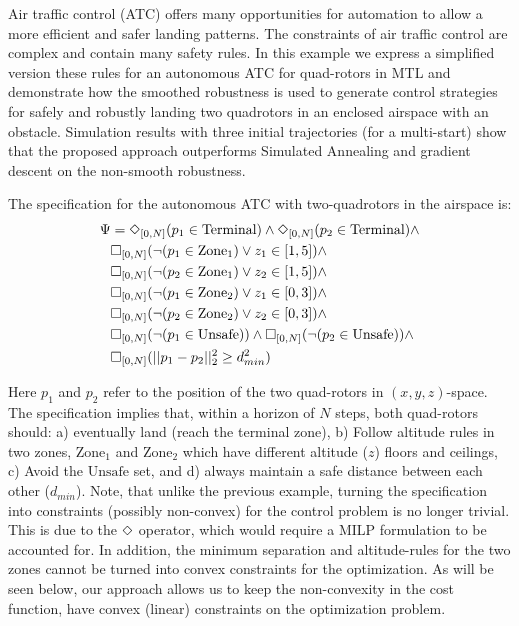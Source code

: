 
Air traffic control (ATC) offers many opportunities for automation to allow a more efficient and safer landing patterns. The constraints of air traffic control are complex and contain many safety rules. In this example we express a simplified version these rules for an autonomous ATC for quad-rotors in MTL and demonstrate how the smoothed robustness is used to generate control strategies for safely and robustly landing two quadrotors in an enclosed airspace with an obstacle. Simulation results with three initial trajectories (for a multi-start) show that the proposed approach outperforms Simulated Annealing and gradient descent on the non-smooth robustness.

The specification for the autonomous ATC with two-quadrotors in the airspace is:
{\small
\begin{subequations}
\begin{align}
\Psi &= \Diamond_{[0,N]}(p_1 \in \text{Terminal}) \wedge \Diamond_{[0,N]}(p_2 \in \text{Terminal}) \wedge   \nonumber \\
& \square_{[0,N]} (\neg (p_1 \in \text{Zone}_1) \vee z_1 \in [1,5]) \wedge \nonumber \\
& \square_{[0,N]} (\neg (p_2 \in \text{Zone}_1) \vee z_2 \in [1,5]) \wedge \nonumber \\
& \square_{[0,N]} (\neg (p_1 \in \text{Zone}_2) \vee z_1 \in [0,3]) \wedge \nonumber \\
& \square_{[0,N]} (\neg (p_2 \in \text{Zone}_2) \vee z_2 \in [0,3]) \wedge \nonumber \\
& \square_{[0,N]} (\neg (p_1 \in \text{Unsafe})) \wedge \square_{[0,N]} (\neg (p_2 \in \text{Unsafe})) \wedge  \nonumber \\
& \square_{[0,N]} (||p_1-p_2||_2^2 \geq d_{min}^2)
\end{align}
\end{subequations}
}

Here $p_1$ and $p_2$ refer to the position of the two quad-rotors in $(x,y,z)$-space. The specification implies that, within a horizon of $N$ steps,  both quad-rotors should: a) eventually land (reach the terminal zone), b) Follow altitude rules in two zones, $\text{Zone}_1$ and $\text{Zone}_2$ which have different altitude ($z$) floors and ceilings, c) Avoid the $\text{Unsafe}$ set, and d) always maintain a safe distance between each other ($d_{min}$). Note, that unlike the previous example, turning the specification into constraints (possibly non-convex) for the control problem is no longer trivial. This is due to the $\Diamond$ operator, which would require a MILP formulation to be accounted for. In addition, the minimum separation and altitude-rules for the two zones cannot be turned into convex constraints for the optimization. As will be seen below, our approach allows us to keep the non-convexity in the cost function, have convex (linear) constraints on the optimization problem.

